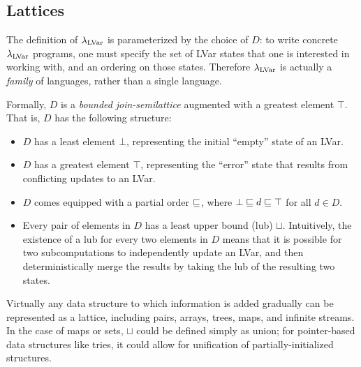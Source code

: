 \subsection{Lattices}\label{subsection:domains}

The definition of $\lambda_{\textrm{LVar}}$ is parameterized by the choice of $D$: to write concrete $\lambda_{\textrm{LVar}}$ programs, one must specify
the set of LVar states that one is interested in working with,
and an ordering on those states.
  Therefore
$\lambda_{\textrm{LVar}}$ is actually a \emph{family} of languages, rather than a
single language.

Formally, $D$ is a \emph{bounded} \emph{join-semilattice} augmented
with a greatest element $\top$.  That is, $D$ has the following
structure:
\begin{itemize}
\item $D$ has a least element $\bot$, representing the initial
  ``empty'' state of an LVar.

\item $D$ has a greatest element $\top$, representing the ``error''
  state that results from conflicting updates to an LVar.

\item $D$ comes equipped with a partial order $\sqsubseteq$, where $\bot
  \sqsubseteq d \sqsubseteq \top$ for all $d \in D$.

\item Every pair of elements in $D$ has a least upper bound (lub)
  $\sqcup$.  Intuitively, the existence of a lub for every two
  elements in $D$ means that it is possible for two subcomputations to
  independently update an LVar, and then deterministically merge the
  results by taking the lub of the resulting two states.
\end{itemize}

\noindent Virtually any data structure to which information
is added gradually can be represented as a lattice,
including pairs, arrays, trees, maps, and infinite streams.
%
{In the case of maps or sets, $\sqcup$ could be defined simply as union; for
pointer-based data structures like tries, it could allow for unification of partially-initialized structures.}
%

